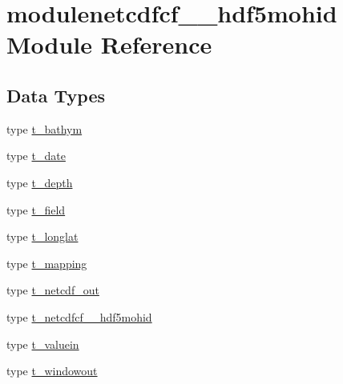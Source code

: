 \hypertarget{namespacemodulenetcdfcf__2__hdf5mohid}{}\section{modulenetcdfcf\+\_\+\_\+hdf5mohid Module Reference}
\label{namespacemodulenetcdfcf__2__hdf5mohid}
\subsection*{Data Types}
\begin{DoxyCompactItemize}
\item 
type \mbox{\hyperlink{structmodulenetcdfcf__2__hdf5mohid_1_1t__bathym}{t\+\_\+bathym}}
\item 
type \mbox{\hyperlink{structmodulenetcdfcf__2__hdf5mohid_1_1t__date}{t\+\_\+date}}
\item 
type \mbox{\hyperlink{structmodulenetcdfcf__2__hdf5mohid_1_1t__depth}{t\+\_\+depth}}
\item 
type \mbox{\hyperlink{structmodulenetcdfcf__2__hdf5mohid_1_1t__field}{t\+\_\+field}}
\item 
type \mbox{\hyperlink{structmodulenetcdfcf__2__hdf5mohid_1_1t__longlat}{t\+\_\+longlat}}
\item 
type \mbox{\hyperlink{structmodulenetcdfcf__2__hdf5mohid_1_1t__mapping}{t\+\_\+mapping}}
\item 
type \mbox{\hyperlink{structmodulenetcdfcf__2__hdf5mohid_1_1t__netcdf__out}{t\+\_\+netcdf\+\_\+out}}
\item 
type \mbox{\hyperlink{structmodulenetcdfcf__2__hdf5mohid_1_1t__netcdfcf__2__hdf5mohid}{t\+\_\+netcdfcf\+\_\+\_\+hdf5mohid}}
\item 
type \mbox{\hyperlink{structmodulenetcdfcf__2__hdf5mohid_1_1t__valuein}{t\+\_\+valuein}}
\item 
type \mbox{\hyperlink{structmodulenetcdfcf__2__hdf5mohid_1_1t__windowout}{t\+\_\+windowout}}
\end{DoxyCompactItemize}
